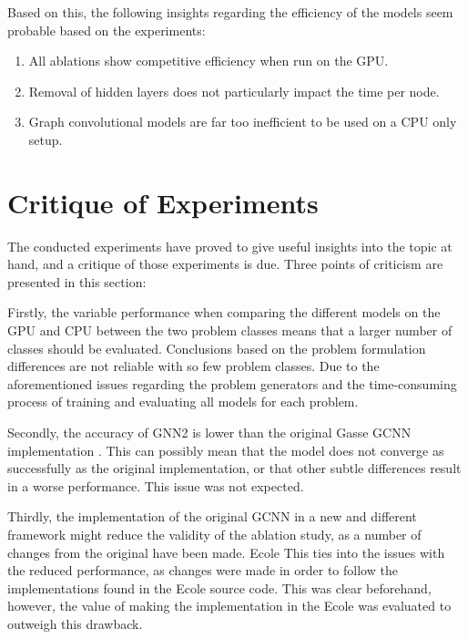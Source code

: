 Based on this, the following insights regarding the efficiency of the models seem probable based on the experiments:
\begin{enumerate}[label=(\roman*)]
    \item All ablations show competitive efficiency when run on the \gls{GPU}.
    \item Removal of hidden layers does not particularly impact the time per node.
    \item Graph convolutional models are far too inefficient to be used on a \gls{CPU} only setup. 
\end{enumerate}






\section{Critique of Experiments}

The conducted experiments have proved to give useful insights into the topic at hand, and a critique of those experiments is due. Three points of criticism are presented in this section:


Firstly, the variable performance when comparing the different models on the \gls{GPU} and \gls{CPU} between the two problem classes means that a larger number of classes should be evaluated. Conclusions based on the problem formulation differences are not reliable with so few problem classes. Due to the aforementioned issues regarding the problem generators and the time-consuming process of training and evaluating all models for each problem. 

Secondly, the accuracy of GNN2 is lower than the original Gasse \gls{GCNN} implementation \cite{gasse2019exact}. This can possibly mean that the model does not converge as successfully as the original implementation, or that other subtle differences result in a worse performance. This issue was not expected. 

Thirdly, the implementation of the original \gls{GCNN} in a new and different framework might reduce the validity of the ablation study, as a number of changes from the original have been made.
\gls{Ecole} This ties into the issues with the reduced performance, as changes were made in order to follow the implementations found in the \gls{Ecole} source code. This was clear beforehand, however, the value of making the implementation in the \gls{Ecole} was evaluated to outweigh this drawback.



